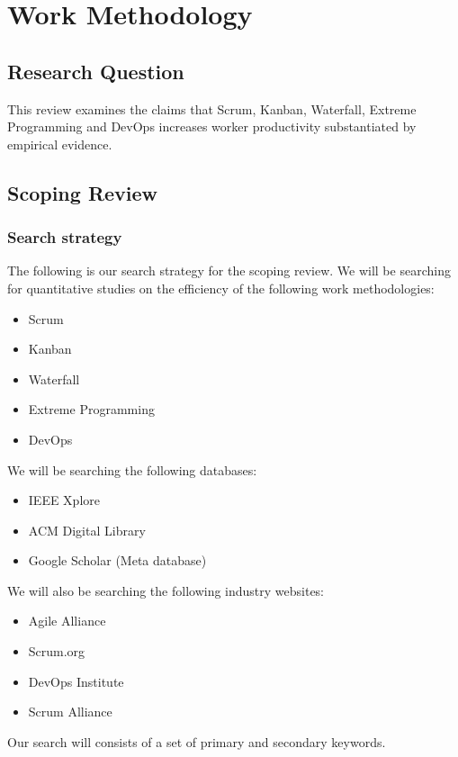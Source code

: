 \documentclass[12pt]{article}
\begin{document}
\section{Work Methodology}

\subsection{Research Question}
This review examines the claims that Scrum, Kanban, Waterfall, Extreme Programming and DevOps 
increases worker productivity substantiated by empirical evidence.

\subsection{Scoping Review}

\subsubsection{Search strategy}
The following is our search strategy for the scoping review.
We will be searching for quantitative studies on the efficiency of the following work methodologies:
\begin{itemize}
  \item Scrum
  \item Kanban
  \item Waterfall
  \item Extreme Programming
  \item DevOps
\end{itemize}
We will be searching the following databases:
\begin{itemize}
  \item IEEE Xplore \cite{IEEEXplore}
  \item ACM Digital Library \cite{ACMDigitalLibrary}
  \item Google Scholar \cite{GoogleScholar} (Meta database)
\end{itemize}
We will also be searching the following industry websites:
\begin{itemize}
  \item Agile Alliance \cite{AgileAlliance2015}
  \item Scrum.org \cite{HomeScrumorg}
  \item DevOps Institute \cite{Organisations}
  \item Scrum Alliance \cite{ScrumAllianceFind}
\end{itemize}
Our search will consists of a set of primary and secondary keywords.
\end{document}
